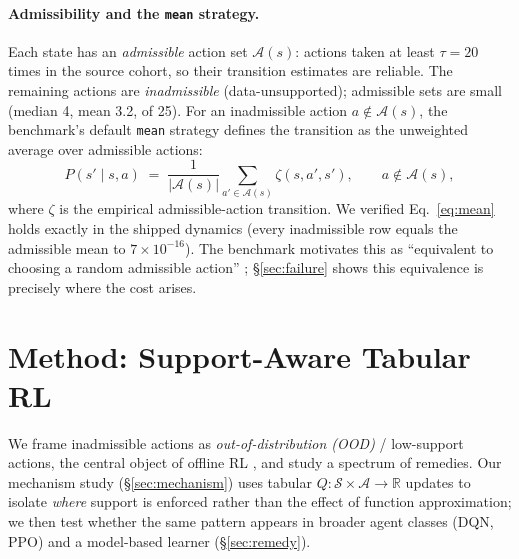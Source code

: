 \documentclass{article}
\newcommand{\Adm}{\mathcal{A}}
\begin{document}
\paragraph{Admissibility and the \texttt{mean} strategy.}
Each state has an \emph{admissible} action set $\Adm(s)$: actions taken at least
$\tau{=}20$ times in the source cohort, so their transition estimates are reliable.
The remaining actions are \emph{inadmissible} (data-unsupported); admissible sets
are small (median 4, mean 3.2, of 25). For an inadmissible action $a\notin\Adm(s)$,
the benchmark's default \texttt{mean} strategy defines the transition as the
unweighted average over admissible actions:
\begin{equation}
\label{eq:mean}
P(s'\mid s,a) \;=\; \frac{1}{|\Adm(s)|}\sum_{a'\in\Adm(s)} \zeta(s,a',s'),
\qquad a\notin\Adm(s),
\end{equation}
where $\zeta$ is the empirical admissible-action transition. We verified
Eq.~\eqref{eq:mean} holds exactly in the shipped dynamics (every inadmissible row
equals the admissible mean to $7\times10^{-16}$). The benchmark motivates this as
``equivalent to choosing a random admissible action'' \citep{choudhary2024icusepsis};
\S\ref{sec:failure} shows this equivalence is precisely where the cost arises.

\section{Method: Support-Aware Tabular RL}
\label{sec:method}
We frame inadmissible actions as \emph{out-of-distribution (OOD)} / low-support
actions, the central object of offline RL \citep{fujimoto2019bcq,kumar2020cql},
and study a spectrum of remedies. Our mechanism study (\S\ref{sec:mechanism}) uses
tabular $Q:\mathcal{S}\times\mathcal{A}\to\mathbb{R}$ updates to isolate \emph{where}
support is enforced rather than the effect of function approximation; we then test
whether the same pattern appears in broader agent classes (DQN, PPO) and a
model-based learner (\S\ref{sec:remedy}).
\end{document}
